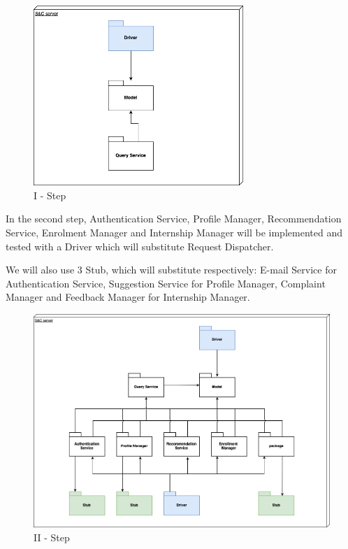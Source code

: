 \begin{figure}[H]
    \centering
    \includegraphics[width=300px]{../../assets/pakege-diagram/implementation_plan_1.png}
    \caption{I - Step}
\end{figure}


\newpage

In the second step, Authentication Service, Profile Manager, Recommendation Service, Enrolment Manager and
Internship Manager will be implemented and tested with a Driver which will substitute Request Dispatcher.

We will also use 3 Stub, which will substitute respectively: E-mail Service for Authentication Service, 
Suggestion Service for Profile Manager, Complaint Manager and Feedback Manager for Internship Manager.

\begin{figure}[H]
    \centering
    \includegraphics[width=450px]{../../assets/pakege-diagram/implementation_plan_2.png}
    \caption{II - Step}
\end{figure}


\newpage


